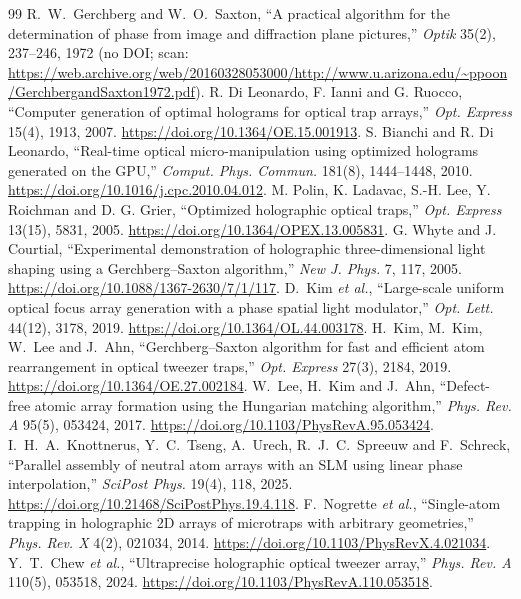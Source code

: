 \begin{thebibliography}{99}\small
{} R.~W.~Gerchberg and W.~O.~Saxton, ``A practical algorithm for the determination of phase from image and diffraction plane pictures,'' \emph{Optik} 35(2), 237--246, 1972 (no DOI; scan: \url{https://web.archive.org/web/20160328053000/http://www.u.arizona.edu/~ppoon/GerchbergandSaxton1972.pdf}).
 R. Di Leonardo, F. Ianni and G. Ruocco, ``Computer generation of optimal holograms for optical trap arrays,'' \emph{Opt. Express} 15(4), 1913, 2007. \url{https://doi.org/10.1364/OE.15.001913}.
 S. Bianchi and R. Di Leonardo, ``Real-time optical micro-manipulation using optimized holograms generated on the GPU,'' \emph{Comput. Phys. Commun.} 181(8), 1444--1448, 2010. \url{https://doi.org/10.1016/j.cpc.2010.04.012}.
 M. Polin, K. Ladavac, S.-H. Lee, Y. Roichman and D. G. Grier, ``Optimized holographic optical traps,'' \emph{Opt. Express} 13(15), 5831, 2005. \url{https://doi.org/10.1364/OPEX.13.005831}.
 G. Whyte and J. Courtial, ``Experimental demonstration of holographic three-dimensional light shaping using a Gerchberg--Saxton algorithm,'' \emph{New J. Phys.} 7, 117, 2005. \url{https://doi.org/10.1088/1367-2630/7/1/117}.
 D.~Kim \emph{et al.}, ``Large-scale uniform optical focus array generation with a phase spatial light modulator,'' \emph{Opt. Lett.} 44(12), 3178, 2019. \url{https://doi.org/10.1364/OL.44.003178}.
 H.~Kim, M.~Kim, W.~Lee and J.~Ahn, ``Gerchberg--Saxton algorithm for fast and efficient atom rearrangement in optical tweezer traps,'' \emph{Opt. Express} 27(3), 2184, 2019. \url{https://doi.org/10.1364/OE.27.002184}.
 W.~Lee, H.~Kim and J.~Ahn, ``Defect-free atomic array formation using the Hungarian matching algorithm,'' \emph{Phys. Rev. A} 95(5), 053424, 2017. \url{https://doi.org/10.1103/PhysRevA.95.053424}.
 I.~H.~A.~Knottnerus, Y.~C.~Tseng, A.~Urech, R.~J.~C.~Spreeuw and F.~Schreck, ``Parallel assembly of neutral atom arrays with an SLM using linear phase interpolation,'' \emph{SciPost Phys.} 19(4), 118, 2025. \url{https://doi.org/10.21468/SciPostPhys.19.4.118}.
 F.~Nogrette \emph{et al.}, ``Single-atom trapping in holographic 2D arrays of microtraps with arbitrary geometries,'' \emph{Phys. Rev. X} 4(2), 021034, 2014. \url{https://doi.org/10.1103/PhysRevX.4.021034}.
 Y.~T.~Chew \emph{et al.}, ``Ultraprecise holographic optical tweezer array,'' \emph{Phys. Rev. A} 110(5), 053518, 2024. \url{https://doi.org/10.1103/PhysRevA.110.053518}.

\end{thebibliography}
